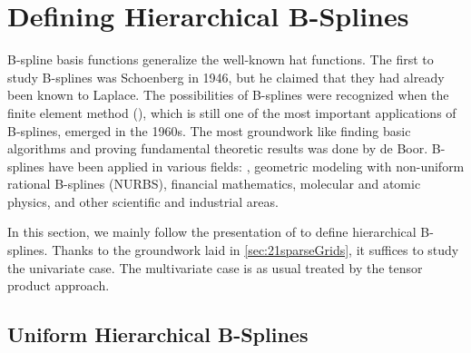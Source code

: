 \section{Defining Hierarchical B-Splines}
\label{sec:22bSplines}


B-spline basis functions generalize the well-known hat functions.
The first to study B-splines was Schoenberg in 1946,
but he claimed that they had already been known to Laplace.
%
The possibilities of B-splines were recognized when
the finite element method (\fem),
which is still one of the most important applications of B-splines,
emerged in the 1960s.
The most groundwork like finding basic algorithms and proving fundamental
theoretic results was done by de Boor.
B-splines have been applied in various fields:
\fem,
geometric modeling with non-uniform rational B-splines (NURBS),
financial mathematics,
molecular and atomic physics,
and other scientific and industrial areas.

In this section, we mainly follow the presentation of
\cite{Valentin16Hierarchical} to define hierarchical B-splines.
Thanks to the groundwork laid in \cref{sec:21sparseGrids},
it suffices to study the univariate case.
The multivariate case is as usual treated by the tensor product approach.

\subsection{Uniform Hierarchical B-Splines}


